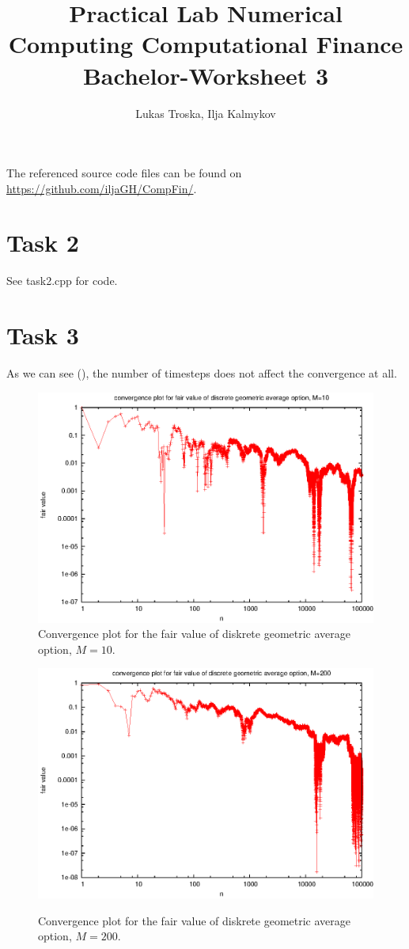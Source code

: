 \documentclass[]{article}
\title{Practical Lab Numerical Computing Computational Finance \\Bachelor-Worksheet 3}
\author{Lukas Troska, Ilja Kalmykov}
\date{}
\begin{document}
\maketitle

The referenced source code files can be found on
\url{https://github.com/iljaGH/CompFin/}.

\section*{Task 2}
See task2.cpp for code.

\section*{Task 3}
As we can see (), the number of timesteps does not
affect the convergence at all.
\begin{figure}[!ht]
\includegraphics{task3_10.eps}
\caption{Convergence plot for the fair value of diskrete geometric average
option, $M = 10$.}
\label{fig:Task3a}
\end{figure}
\begin{figure}[!ht]
\includegraphics{task3_200.eps}\\
\caption{Convergence plot for the fair value of diskrete geometric average
option, $M = 200$.}
\label{fig:Task3b}
\end{figure}
\clearpage
\end{document}
